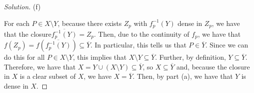 \documentclass[10pt]{article}
\begin{document}
\begin{proof}[Solution]
(f)

For each $P \in X \setminus Y$, because there exists $Z_p$ with $f_p^{-1}(Y)$ dense in $Z_p$, we have that the closure$\overline{f_p^{-1}(Y)} = Z_p$. Then, due to the continuity of $f_p$,  we have that $f(Z_p) = f(\overline{f_p^{-1}(Y)}) \subseteq \overline{Y}$. In particular, this tells us that $P \in \overline Y$. Since we can do this for all $P \in X \setminus Y$, this implies that $X \setminus Y \subseteq \overline{Y}$. Further, by definition, $Y \subseteq \overline{Y}$. Therefore, we have that $X = Y \cup (X \setminus Y) \subseteq \overline{Y}$, so $X \subseteq \overline{Y}$ and, because the closure in $X$ is a clear subset of $X$, we have $X = \overline{Y}$. Then, by part (a), we have that $Y$ is dense in $X$.
\end{proof}
\end{document}
